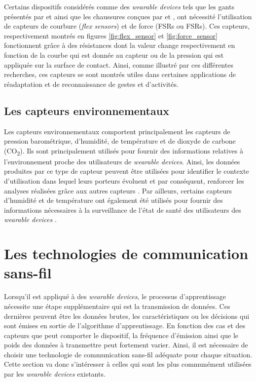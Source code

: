 Certains dispositifs considérés comme des \textit{wearable devices} tels que les gants présentés par \cite{Sanford2015} et \cite{Zheng2016} ainsi que les chaussures conçues par \cite{Bamberg2008} et \cite{Bae2013}, ont nécessité l'utilisation de capteurs de courbure (\textit{flex sensors}) et de force (\aclp{FSR} ou \acsp{FSR}). Ces capteurs, respectivement montrés en figures \ref{fig:flex_sensor} et \ref{fig:force_sensor} fonctionnent grâce à des résistances dont la valeur change respectivement en fonction de la courbe qui est donnée au capteur ou de la pression qui est appliquée sur la surface de contact. Ainsi, comme illustré par ces différentes recherches, ces capteurs se sont montrés utiles dans certaines applications de réadaptation et de reconnaissance de gestes et d'activités.

\subsection{Les capteurs environnementaux}

Les capteurs environnementaux comportent principalement les capteurs de pression barométrique, d'humidité, de température et de dioxyde de carbone (CO\textsubscript2). Ils sont principalement utilisés pour fournir des informations relatives à l'environnement proche des utilisateurs de \textit{wearable devices}. Ainsi, les données produites par ce type de capteur peuvent être utilisées pour identifier le contexte d'utilisation dans lequel leurs porteurs évoluent et par conséquent, renforcer les analyses réalisées grâce aux autres capteurs \citep{Acampora2013}. Par ailleurs, certains capteurs d'humidité et de température ont également été utilisés pour fournir des informations nécessaires à la surveillance de l'état de santé des utilisateurs des \textit{wearable devices} \citep{Anliker2004}.

\section{Les technologies de communication sans-fil}

Lorsqu'il est appliqué à des \textit{wearable devices}, le processus d'apprentissage nécessite une étape supplémentaire qui est la transmission de données. Ces dernières peuvent être les données brutes, les caractéristiques ou les décisions qui sont émises en sortie de l'algorithme d'apprentissage. En fonction des cas et des capteurs que peut comporter le dispositif, la fréquence d'émission ainsi que le poids des données à transmettre peut fortement varier. Ainsi, il est nécessaire de choisir une technologie de communication sans-fil adéquate pour chaque situation. Cette section va donc s'intéresser à celles qui sont les plus communément utilisées par les \textit{wearable devices} existants.

